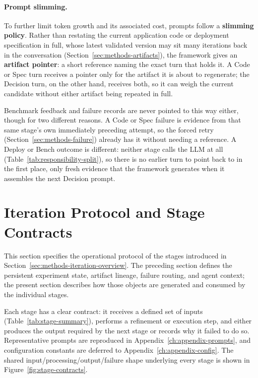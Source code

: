 \paragraph{Prompt slimming.}
To further limit token growth and its associated cost, prompts follow a
\textbf{slimming policy}. Rather than restating the current application code
or deployment specification in full, whose latest validated version may sit
many iterations back in the conversation (Section~\ref{sec:methods-artifacts}),
the framework gives an \textbf{artifact pointer}: a short reference naming the
exact turn that holds it. A Code or Spec turn receives a pointer only for the
artifact it is about to regenerate; the Decision turn, on the other hand,
receives both, so it can weigh the current candidate without either artifact
being repeated in full.

Benchmark feedback and failure records are never pointed to this way either,
though for two different reasons. A Code or Spec failure is evidence from
that same stage's own immediately preceding attempt, so the forced retry
(Section~\ref{sec:methods-failure}) already has it without needing a
reference. A Deploy or Bench outcome is different: neither stage calls the
LLM at all (Table~\ref{tab:responsibility-split}), so there is no earlier
turn to point back to in the first place, only fresh evidence that the
framework generates when it assembles the next Decision prompt.


\newpage
\section{Iteration Protocol and Stage Contracts}
\label{sec:methods-phases}
\label{sec:methods-loop}

This section specifies the operational protocol of the stages introduced in
Section~\ref{sec:methods-iteration-overview}. The preceding section defines
the persistent experiment state, artifact lineage, failure routing, and agent
context; the present section describes how those objects are generated and
consumed by the individual stages.

Each stage has a clear contract: it receives a defined set of inputs
(Table~\ref{tab:stage-summary}), performs a refinement or execution step, and
either produces the output required by the next stage or records why it
failed to do so. Representative prompts are reproduced in
Appendix~\ref{ch:appendix-prompts}, and configuration constants are deferred
to Appendix~\ref{ch:appendix-config}. The shared input/processing/output/failure
shape underlying every stage is shown in Figure~\ref{fig:stage-contracts}.


